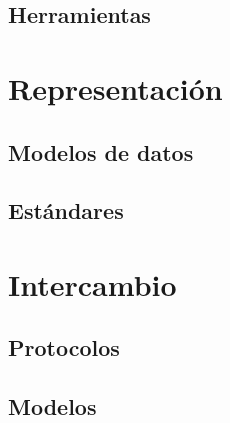 \documentclass[11pt]{article}
\begin{document}
\subsection{Herramientas}


\section{Representación}
\subsection{Modelos de datos}

  
  
  
  
\subsection{Estándares}

\section{Intercambio}
\subsection{Protocolos}
 
 
\subsection{Modelos}
     


\newpage
\nocite{*}
 

\end{document}
